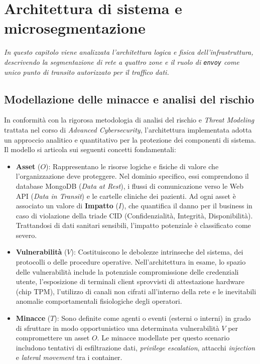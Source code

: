 \section{Architettura di sistema e microsegmentazione}
\label{sec:architettura}
\thispagestyle{plain}

{\itshape In questo capitolo viene analizzata l'architettura logica e fisica dell'infrastruttura, descrivendo la segmentazione di rete a quattro zone e il ruolo di \texttt{envoy} come unico punto di transito autorizzato per il traffico dati.}

\subsection{Modellazione delle minacce e analisi del rischio}
In conformità con la rigorosa metodologia di analisi del rischio e \textit{Threat Modeling} trattata nel corso di \textit{Advanced Cybersecurity}, l'architettura implementata adotta un approccio analitico e quantitativo per la protezione dei componenti di sistema. Il modello si articola sui seguenti concetti fondamentali:

\begin{itemize}
    \item \textbf{Asset} ($O$): Rappresentano le risorse logiche e fisiche di valore che l'organizzazione deve proteggere. Nel dominio specifico, essi comprendono il database MongoDB (\textit{Data at Rest}), i flussi di comunicazione verso le Web API (\textit{Data in Transit}) e le cartelle cliniche dei pazienti. Ad ogni asset è associato un valore di \textbf{Impatto} ($I$), che quantifica il danno per il business in caso di violazione della triade CID (Confidenzialità, Integrità, Disponibilità). Trattandosi di dati sanitari sensibili, l'impatto potenziale è classificato come severo.
    \item \textbf{Vulnerabilità} ($V$): Costituiscono le debolezze intrinseche del sistema, dei protocolli o delle procedure operative. Nell'architettura in esame, lo spazio delle vulnerabilità include la potenziale compromissione delle credenziali utente, l'esposizione di terminali client sprovvisti di attestazione hardware (chip TPM), l'utilizzo di canali non cifrati all'interno della rete e le inevitabili anomalie comportamentali fisiologiche degli operatori.
    \item \textbf{Minacce} ($T$): Sono definite come agenti o eventi (esterni o interni) in grado di sfruttare in modo opportunistico una determinata vulnerabilità $V$ per compromettere un asset $O$. Le minacce modellate per questo scenario includono tentativi di esfiltrazione dati, \textit{privilege escalation}, attacchi \textit{injection} e \textit{lateral movement} tra i container.
\end{itemize}

